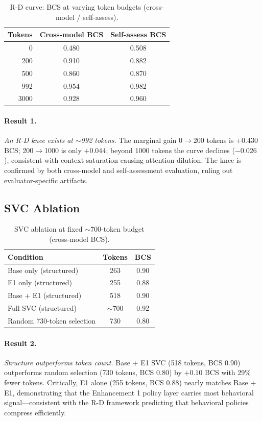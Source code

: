 \documentclass[10pt,twocolumn]{article}
\begin{document}
\begin{table}[h]
\centering
\caption{R-D curve: BCS at varying token budgets (cross-model / self-assess).}
\label{tab:rd}
\small
\begin{tabular}{@{}rcc@{}}
\toprule
Tokens & Cross-model BCS & Self-assess BCS \\
\midrule
0   & 0.480 & 0.508 \\
200 & 0.910 & 0.882 \\
500 & 0.860 & 0.870 \\
992 & 0.954 & 0.982 \\
3000 & 0.928 & 0.960 \\
\bottomrule
\end{tabular}
\end{table}

\paragraph{Result 1.}
\emph{An R-D knee exists at $\sim$992 tokens.}
The marginal gain 0$\to$200 tokens is $+0.430$ BCS; 200$\to$1000 is
only $+0.044$; beyond 1000 tokens the curve declines ($-0.026$),
consistent with context saturation causing attention dilution.
The knee is confirmed by both cross-model and self-assessment
evaluation, ruling out evaluator-specific artifacts.

\subsection{SVC Ablation}

\begin{table}[h]
\centering
\caption{SVC ablation at fixed $\sim$700-token budget (cross-model BCS).}
\label{tab:svc_ablation}
\small
\begin{tabular}{@{}lcc@{}}
\toprule
Condition & Tokens & BCS \\
\midrule
Base only (structured) & 263 & 0.90 \\
E1 only (structured) & 255 & 0.88 \\
Base + E1 (structured) & 518 & 0.90 \\
Full SVC (structured) & $\sim$700 & 0.92 \\
Random 730-token selection & 730 & 0.80 \\
\bottomrule
\end{tabular}
\end{table}

\paragraph{Result 2.}
\emph{Structure outperforms token count.}
Base + E1 SVC (518 tokens, BCS 0.90) outperforms random selection
(730 tokens, BCS 0.80) by $+0.10$ BCS with 29\% fewer tokens.
Critically, E1 alone (255 tokens, BCS 0.88) nearly matches Base + E1,
demonstrating that the Enhancement 1 policy layer carries most behavioral
signal—consistent with the R-D framework predicting that
behavioral policies compress efficiently.
\end{document}
